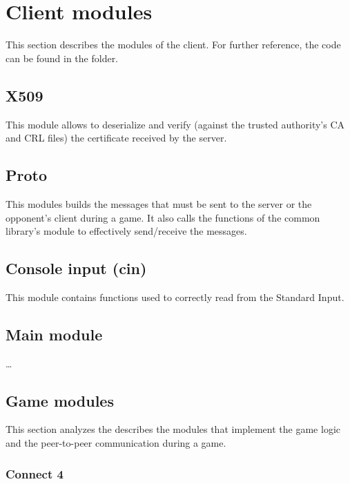 \section{Client modules}\label{sec:clientmod}

This section describes the modules of the client. For further reference, the
code can be found in the  folder.

\subsection{X509}\label{subsec:clientx509mod}

This module allows to deserialize and verify (against the trusted authority's CA
and CRL files) the certificate received by the server.

\subsection{Proto}\label{subsec:clientprotomod}

This modules builds the messages that must be sent to the server or the
opponent's client during a game. It also calls the functions of the common
library's  module to effectively send/receive the messages.

\subsection{Console input (cin)}\label{subsec:cinmod}

This module contains functions used to correctly read from the Standard Input.

\subsection{Main module}\label{subsec:clientmainmod}

\ldots

\subsection{Game modules}\label{subsec:gamemods}

This section analyzes the describes the modules that implement the game logic
and the peer-to-peer communication during a game.

\subsubsection{Connect 4}

